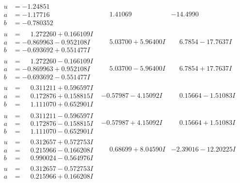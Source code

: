 \documentclass[1p]{elsarticle_modified}
\theoremstyle{definition}
\begin{document}
$$\begin{array}{c|c|c}
\begin{aligned}
u &= -1.24851\phantom{ +0.000000I} \\
a &= -1.17716\phantom{ +0.000000I} \\
b &= -0.780352\phantom{ +0.000000I}\end{aligned}
 & \phantom{-}1.41069\phantom{ +0.000000I} & -14.4990\phantom{ +0.000000I} \\ \hline\begin{aligned}
u &= \phantom{-}1.272260 + 0.166109 I \\
a &= -0.869963 - 0.952108 I \\
b &= -0.693692 + 0.551477 I\end{aligned}
 & \phantom{-}5.03700 + 5.96400 I & \phantom{-}6.7854 - 17.7637 I \\ \hline\begin{aligned}
u &= \phantom{-}1.272260 - 0.166109 I \\
a &= -0.869963 + 0.952108 I \\
b &= -0.693692 - 0.551477 I\end{aligned}
 & \phantom{-}5.03700 - 5.96400 I & \phantom{-}6.7854 + 17.7637 I \\ \hline\begin{aligned}
u &= \phantom{-}0.311211 + 0.596597 I \\
a &= \phantom{-}0.172876 + 0.158815 I \\
b &= \phantom{-}1.111070 + 0.652901 I\end{aligned}
 & -0.57987 - 4.15092 I & \phantom{-}0.15664 - 1.51083 I \\ \hline\begin{aligned}
u &= \phantom{-}0.311211 - 0.596597 I \\
a &= \phantom{-}0.172876 - 0.158815 I \\
b &= \phantom{-}1.111070 - 0.652901 I\end{aligned}
 & -0.57987 + 4.15092 I & \phantom{-}0.15664 + 1.51083 I \\ \hline\begin{aligned}
u &= \phantom{-}0.312657 + 0.572753 I \\
a &= \phantom{-}0.215966 - 0.166208 I \\
b &= \phantom{-}0.990024 - 0.564976 I\end{aligned}
 & \phantom{-}0.68699 + 8.04590 I & -2.39016 - 12.20225 I \\ \hline\begin{aligned}
u &= \phantom{-}0.312657 - 0.572753 I \\
a &= \phantom{-}0.215966 + 0.166208 I \\

\end{aligned}
\end{array}$$
\end{document}
